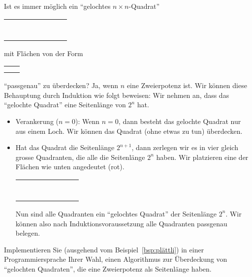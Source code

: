 \begin{example}\label{bsp:plättli}
Ist es immer möglich ein ``gelochtes $n\times n$-Quadrat''
\begin{center}
\begin{tabular}{ | c | c | c | c | c  | c | c | c | }
\hline
&&&&&&&\\
\hline
&&&&&&&\\
\hline
&&&&&&&\\
\hline
&&&&&&&\\
\hline
&&&&&&\cellcolor{black}&\\
\hline
&&&&&&&\\
\hline
&&&&&&&\\
\hline
&&&&&&&\\
\hline
\end{tabular}
\end{center}

mit Flächen von der Form
\begin{tabular}{ c c }
&\cellcolor{black}\\
\cellcolor{black}&\cellcolor{black}
\end{tabular}
``passgenau'' zu überdecken? Ja, wenn $n$ eine Zweierpotenz ist. Wir können diese Behauptung durch Induktion wie folgt beweisen:  Wir nehmen an, dass das ``gelochte Quadrat'' eine Seitenlänge von $2^n$ hat.
\begin{itemize}
\item Verankerung ($n=0$): Wenn $n=0$, dann besteht das gelochte Quadrat nur aus einem Loch. Wir können das Quadrat (ohne etwas zu tun) überdecken.
\item Hat das Quadrat die Seitenlänge $2^{n+1}$, dann zerlegen wir es in vier gleich grosse Quadranten, die alle die Seitenlänge $2^n$ haben. Wir platzieren eine der Flächen wie unten angedeutet (rot).
\begin{center}
\begin{tabular}{ | c | c | c | c !{\color{red}\vrule} c  | c | c | c | }
\hline
&&&&&&&\\
\hline
&&&&&&&\\
\hline
&&&&&&&\\
\hline
&&&&&&&\\
\hline
{}&&&&&&&\\
\hline
&&&&&&&\\
\hline
&&&&&&&\\
\hline
&&&&&&&\\
\hline
\end{tabular}
\end{center}
Nun sind alle Quadranten ein ``gelochtes Quadrat'' der Seitenlänge $2^n$. Wir können also nach Induktionsvoraussetzung alle Quadranten passgenau belegen.
\end{itemize}
\end{example}

\begin{example}
Implementieren Sie (ausgehend vom Beispiel~\ref{bsp:plättli}) in einer Programmiersprache Ihrer Wahl, einen Algorithmus zur Überdeckung von ``gelochten Quadraten'', die eine Zweierpotenz als Seitenlänge haben.
\end{example}